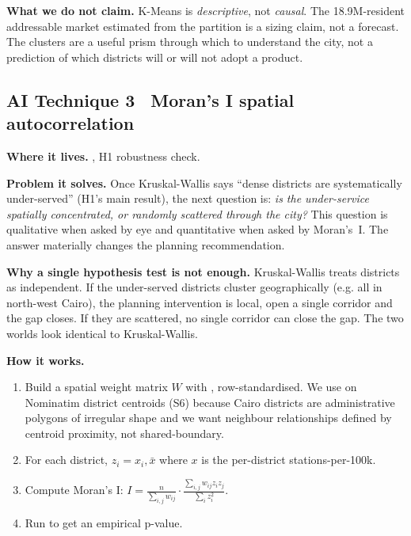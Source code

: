 \textbf{What we do not claim.} K-Means is \emph{descriptive}, not
\emph{causal}. The 18.9M-resident addressable market estimated from
the partition is a sizing claim, not a forecast. The clusters are a
useful prism through which to understand the city, not a prediction of
which districts will or will not adopt a product.

\subsection{AI Technique 3 \textbullet\ Moran's I spatial autocorrelation}

\textbf{Where it lives.} , H1 robustness check.

\textbf{Problem it solves.} Once Kruskal-Wallis says ``dense districts
are systematically under-served'' (H1's main result), the next question
is: \emph{is the under-service spatially concentrated, or randomly
scattered through the city?} This question is qualitative when asked
by eye and quantitative when asked by Moran's~I. The answer materially
changes the planning recommendation.

\textbf{Why a single hypothesis test is not enough.} Kruskal-Wallis
treats districts as independent. If the under-served districts cluster
geographically (e.g. all in north-west Cairo), the planning
intervention is local, open a single corridor and the gap closes. If
they are scattered, no single corridor can close the gap. The two
worlds look identical to Kruskal-Wallis.

\textbf{How it works.}
\begin{enumerate}
 \item Build a spatial weight matrix $W$ with
 , row-standardised.
 We use  on Nominatim district centroids
 (S6) because Cairo districts are administrative polygons of
 irregular shape and we want neighbour relationships defined
 by centroid proximity, not shared-boundary.
 \item For each district, $z_i = x_i, \bar{x}$ where $x$ is the
 per-district stations-per-100k.
 \item Compute Moran's I:
 $I = \frac{n}{\sum_{i,j} w_{ij}} \cdot
 \frac{\sum_{i,j} w_{ij} z_i z_j}{\sum_i z_i^2}$.
 \item Run  to get an
 empirical p-value.
\end{enumerate}

